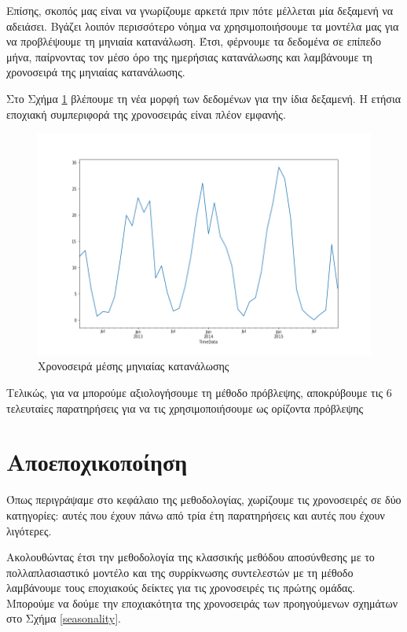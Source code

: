 Επίσης, σκοπός μας είναι να γνωρίζουμε αρκετά πριν πότε μέλλεται μία δεξαμενή να αδειάσει. Βγάζει λοιπόν περισσότερο νόημα να χρησιμοποιήσουμε τα μοντέλα μας για να προβλέψουμε τη μηνιαία κατανάλωση. Έτσι, φέρνουμε τα δεδομένα σε επίπεδο μήνα, παίρνοντας τον μέσο όρο της ημερήσιας κατανάλωσης και λαμβάνουμε τη χρονοσειρά της μηνιαίας κατανάλωσης.

Στο Σχήμα \ref{originalmonthlyTS} βλέπουμε τη νέα μορφή των δεδομένων για την ίδια δεξαμενή. Η ετήσια εποχιακή συμπεριφορά της χρονοσειράς είναι πλέον εμφανής.

\begin{figure}[t!]
  \includegraphics[scale=0.5]{figures/originalmonthly.png}
\centering
\caption{Χρονοσειρά μέσης μηνιαίας κατανάλωσης}
\label{originalmonthlyTS}
\end{figure} 

Τελικώς, για να μπορούμε αξιολογήσουμε τη μέθοδο πρόβλεψης, αποκρύβουμε τις 6 τελευταίες παρατηρήσεις για να τις χρησιμοποιήσουμε ως ορίζοντα πρόβλεψης

\section{Αποεποχικοποίηση}

Όπως περιγράψαμε στο κεφάλαιο της μεθοδολογίας, χωρίζουμε τις χρονοσειρές σε δύο κατηγορίες: αυτές που έχουν πάνω από τρία έτη παρατηρήσεις και αυτές που έχουν λιγότερες.  

Ακολουθώντας έτσι την μεθοδολογία της κλασσικής μεθόδου αποσύνθεσης με το πολλαπλασιαστικό μοντέλο και της συρρίκνωσης συντελεστών με τη μέθοδο  λαμβάνουμε τους εποχιακούς δείκτες για τις χρονοσειρές τις πρώτης ομάδας. Μπορούμε να δούμε την εποχιακότητα της χρονοσειράς των προηγούμενων σχημάτων στο Σχήμα \ref{seasonality}.

